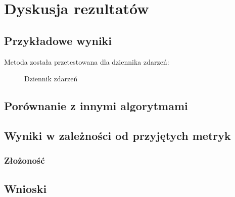 \chapter{Dyskusja rezultatów}

\section{Przykładowe wyniki}
Metoda została przetestowana dla dziennika zdarzeń:
\begin{figure}[!ht]
	\caption{\label{fig:flow_chart}Dziennik zdarzeń}
\end{figure}


\section{Porównanie z innymi algorytmami}

\section{Wyniki w zależności od przyjętych metryk}

\subsection{Złożoność}

\section{Wnioski}

